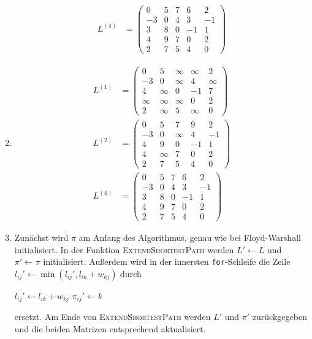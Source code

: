 \documentclass[11pt,a4paper]{article}
\begin{document}
\begin{loesung}
\begin{enumerate}
\begin{align*}
            L^{(4)} &= \begin{pmatrix}
                0 & 5 & 7 & 6 & 2 \\
                -3 & 0 & 4 & 3 & -1 \\
                3 & 8 & 0 & -1 & 1 \\
                4 & 9 & 7 & 0 & 2 \\
                2 & 7 & 5 & 4 & 0
            \end{pmatrix}
        \end{align*}
        \item
        \begin{align*}
            L^{(1)} &= \begin{pmatrix}
                0 & 5 & \infty & \infty & 2 \\
                -3 & 0 & \infty & 4 & \infty \\
                4 & \infty & 0 & -1 & 7 \\
                \infty & \infty & \infty & 0 & 2 \\
                2 & \infty & 5 & \infty & 0
            \end{pmatrix} \\
            L^{(2)} &= \begin{pmatrix}
                0 & 5 & 7 & 9 & 2 \\
                -3 & 0 & \infty & 4 & -1 \\
                4 & 9 & 0 & -1 & 1 \\
                4 & \infty & 7 & 0 & 2 \\
                2 & 7 & 5 & 4 & 0
            \end{pmatrix} \\
            L^{(4)} &= \begin{pmatrix}
                0 & 5 & 7 & 6 & 2 \\
                -3 & 0 & 4 & 3 & -1 \\
                3 & 8 & 0 & -1 & 1 \\
                4 & 9 & 7 & 0 & 2 \\
                2 & 7 & 5 & 4 & 0
            \end{pmatrix}
        \end{align*}
        \item
        Zunächst wird $\pi$ am Anfang des Algorithmus, genau wie bei Floyd-Warshall initialisiert.
        In der Funktion \textsc{ExtendShortestPath} werden $L' \gets L$ und $\pi' \gets \pi$ initialisiert.
        Außerdem wird in der innersten \texttt{for}-Schleife die Zeile $l_{ij}' \gets \min(l_{ij}', l_{ik} + w_{kj})$ durch
        \begin{algorithmic}
                \State $l_{ij}' \gets l_{ik} + w_{kj}$
                \State $\pi_{ij}' \gets k$
            \EndIf
        \end{algorithmic}
        ersetzt.
        Am Ende von \textsc{ExtendShortestPath} werden $L'$ und $\pi'$ zurückgegeben und die beiden Matrizen entsprechend aktualisiert.
    \end{enumerate}
\end{loesung}
\end{document}
